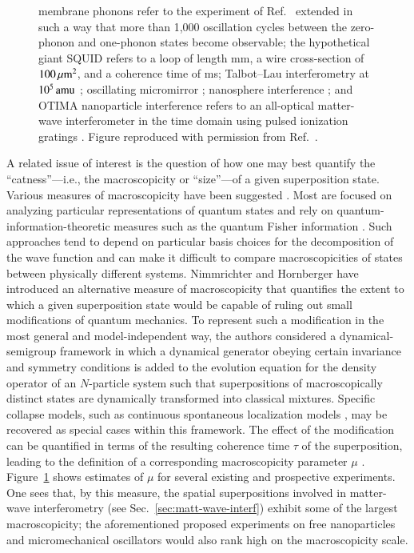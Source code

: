 \documentclass[3p,sort&compress]{elsarticle}
\begin{document}
\begin{figure}
{membrane phonons refer to the experiment of Ref.~\cite{Teufel:2011:oo} extended in such a way that more than 1,000 oscillation cycles between the zero-phonon and one-phonon states become observable;  the hypothetical giant SQUID refers to a loop of length \unit[20]{mm}, a wire cross-section of $\unit[100]{\mu m^2}$, and a coherence time of \unit[1]{ms}; Talbot--Lau interferometry at $\unit[10^5]{amu}$ \cite{Nimmrichter:2011:pr}; oscillating micromirror \cite{Marshall:2003:om}; nanosphere interference \cite{Romero:2011:aa}; and OTIMA nanoparticle interference refers to an all-optical matter-wave interferometer in the time domain using pulsed ionization gratings \cite{Nimmrichter:2011:pr}.  Figure reproduced with permission from Ref.~\cite{Arndt:2014:oo}.}
\label{fig:macro}
\end{figure}

A related issue of interest is the question of how one may best quantify the ``catness''---i.e., the macroscopicity or ``size''---of a given superposition state. Various measures of macroscopicity have been suggested \cite{Leggett:1980:yt,Leggett:2002:uy,Dur:2002:pp,Bjork:2004:pp,Korsbakken:2007:pp,Marquardt:2008:ii,Lee:2011:oo,Frowis:2012:zz,Nimmrichter:2013:aa}. Most are focused on analyzing particular representations of quantum states and rely on quantum-information-theoretic measures such as the quantum Fisher information \cite{Frowis:2012:zz}. Such approaches tend to depend on particular basis choices for the decomposition of the wave function and can make it difficult to compare macroscopicities of states between physically different systems. Nimmrichter and Hornberger \cite{Nimmrichter:2013:aa} have introduced an alternative measure of macroscopicity that quantifies the extent to which a given superposition state would be capable of ruling out small modifications of quantum mechanics. To represent such a modification in the most general and model-independent way, the authors considered a dynamical-semigroup framework in which a dynamical generator obeying certain invariance and symmetry conditions is added to the evolution equation for the density operator of an $N$-particle system such that superpositions of macroscopically distinct states are dynamically transformed into classical mixtures. Specific collapse models, such as continuous spontaneous localization models \cite{Bassi:2003:yb}, may be recovered as special cases within this framework. The effect of the modification can be quantified in terms of the resulting coherence time $\tau$ of the superposition, leading to the definition of a corresponding macroscopicity parameter $\mu$ \cite{Nimmrichter:2013:aa}. Figure~\ref{fig:macro} shows estimates of $\mu$ for several existing and prospective experiments. One sees that, by this measure, the spatial superpositions involved in matter-wave interferometry  (see Sec.~\ref{sec:matt-wave-interf}) exhibit some of the largest macroscopicity; the aforementioned proposed experiments on free nanoparticles \cite{Romero:2011:aa,Wan:2016:oo} and micromechanical oscillators \cite{Marshall:2003:om,Pikovski:2012:aa} would also rank high on the macroscopicity scale. 
\end{document}
